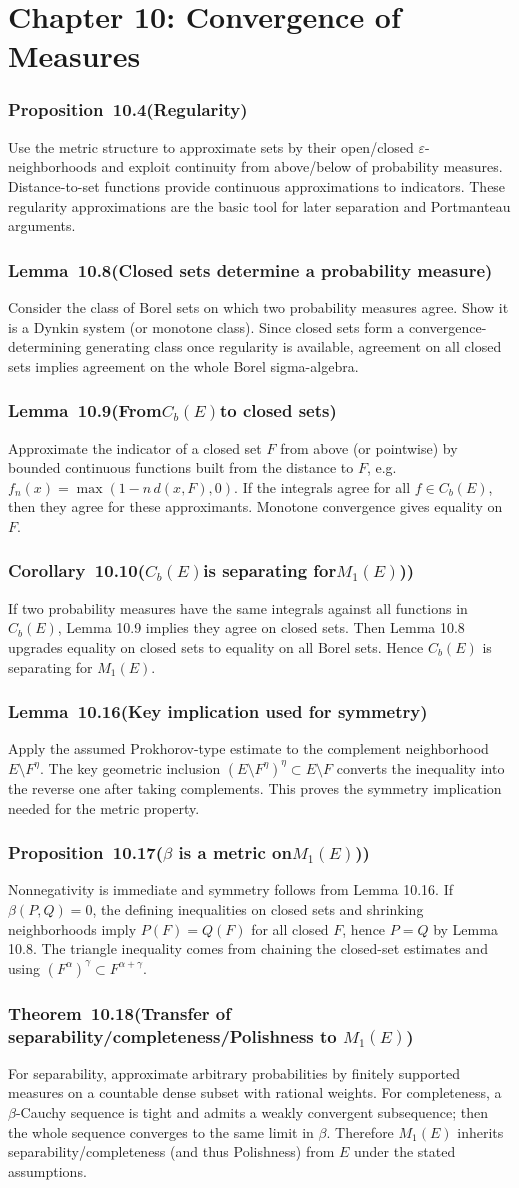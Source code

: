 \documentclass[11pt,a4paper]{article}
\newcommand{\proofcapsule}[4]{%
  \subsubsection*{#1~#2\quad \textnormal{\small(#3)}}%
  #4}
\begin{document}
\section{Chapter 10: Convergence of Measures}
\proofcapsule{Proposition}{10.4}{Regularity}{Use the metric structure to approximate sets by their open/closed $\varepsilon$-neighborhoods and exploit continuity from above/below of probability measures. Distance-to-set functions provide continuous approximations to indicators. These regularity approximations are the basic tool for later separation and Portmanteau arguments.}
\proofcapsule{Lemma}{10.8}{Closed sets determine a probability measure}{Consider the class of Borel sets on which two probability measures agree. Show it is a Dynkin system (or monotone class). Since closed sets form a convergence-determining generating class once regularity is available, agreement on all closed sets implies agreement on the whole Borel sigma-algebra.}
\proofcapsule{Lemma}{10.9}{From$C_b(E)$to closed sets}{Approximate the indicator of a closed set $F$ from above (or pointwise) by bounded continuous functions built from the distance to $F$, e.g. $f_n(x)=\max(1-n\,d(x,F),0)$. If the integrals agree for all $f\in C_b(E)$, then they agree for these approximants. Monotone convergence gives equality on $F$.}
\proofcapsule{Corollary}{10.10}{$C_b(E)$is separating for$M_1(E)$)}{If two probability measures have the same integrals against all functions in $C_b(E)$, Lemma 10.9 implies they agree on closed sets. Then Lemma 10.8 upgrades equality on closed sets to equality on all Borel sets. Hence $C_b(E)$ is separating for $M_1(E)$.}
\proofcapsule{Lemma}{10.16}{Key implication used for symmetry}{Apply the assumed Prokhorov-type estimate to the complement neighborhood $E\setminus F^\eta$. The key geometric inclusion $(E\setminus F^\eta)^\eta\subset E\setminus F$ converts the inequality into the reverse one after taking complements. This proves the symmetry implication needed for the metric property.}
\proofcapsule{Proposition}{10.17}{$\beta$ is  a metric on$M_1(E)$)}{Nonnegativity is immediate and symmetry follows from Lemma 10.16. If $\beta(P,Q)=0$, the defining inequalities on closed sets and shrinking neighborhoods imply $P(F)=Q(F)$ for all closed $F$, hence $P=Q$ by Lemma 10.8. The triangle inequality comes from chaining the closed-set estimates and using $(F^\alpha)^\gamma\subset F^{\alpha+\gamma}$.}
\proofcapsule{Theorem}{10.18}{Transfer of separability/completeness/Polishness to $M_1(E)$}{For separability, approximate arbitrary probabilities by finitely supported measures on a countable dense subset with rational weights. For completeness, a $\beta$-Cauchy sequence is tight and admits a weakly convergent subsequence; then the whole sequence converges to the same limit in $\beta$. Therefore $M_1(E)$ inherits separability/completeness (and thus Polishness) from $E$ under the stated assumptions.}
\end{document}
